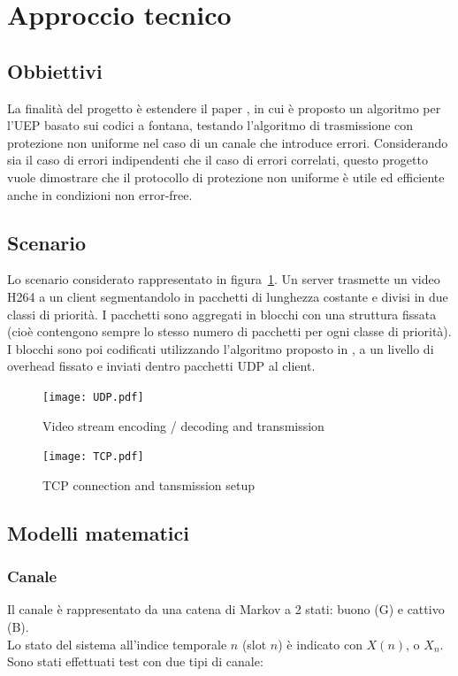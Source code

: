 \documentclass[italian, a4paper, 12pt]{article}
\begin{document}
\section{Approccio tecnico}
\subsection{Obbiettivi} %
La finalità del progetto è estendere il paper \cite{uep}, in cui è proposto un algoritmo per l'UEP basato sui codici a fontana, testando l'algoritmo di trasmissione con protezione non uniforme nel caso di un canale che introduce errori.
%
Considerando sia il caso di errori indipendenti che il caso di errori correlati, questo progetto vuole dimostrare che il protocollo di protezione non uniforme è utile ed efficiente anche in condizioni non error-free.
\subsection{Scenario} %
Lo scenario considerato rappresentato in figura~\ref{fig:UDP}. Un
server trasmette un video H264 a un client segmentandolo in pacchetti
di lunghezza costante e divisi in due classi di priorità. I pacchetti
sono aggregati in blocchi con una struttura fissata (cioè contengono
sempre lo stesso numero di pacchetti per ogni classe di priorità). I
blocchi sono poi codificati utilizzando l'algoritmo proposto in
\cite{uep}, a un livello di overhead fissato e inviati dentro
pacchetti UDP al client.
%
\begin{figure}[H]
    \centering
        \texttt{[image: UDP.pdf]}
    \caption{Video stream encoding / decoding and transmission}
    \label{fig:UDP}
\end{figure}
\begin{figure}[H]
    \centering
        \texttt{[image: TCP.pdf]}
    \caption{TCP connection and tansmission setup}
    \label{fig:TCP}
\end{figure}
%
\newpage
\subsection{Modelli matematici}
\subsubsection{Canale}
\label{sec:markov}
Il canale è rappresentato da una catena di Markov a 2 stati: buono (G) e cattivo (B).\\
Lo stato del sistema all'indice temporale $n$ (slot $n$) è indicato con $X(n)$, o $X_n$.\\
Sono stati effettuati test con due tipi di canale:
\end{document}
